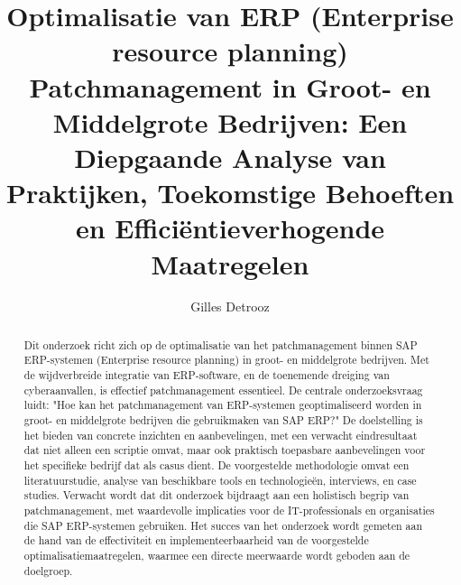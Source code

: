 \documentclass{hogent-article}
\title{Optimalisatie van ERP (Enterprise resource planning) Patchmanagement in Groot- en Middelgrote Bedrijven: Een Diepgaande Analyse van Praktijken, Toekomstige Behoeften en Efficiëntieverhogende Maatregelen}
\author{Gilles Detrooz}
\begin{document}
\begin{abstract}
    Dit onderzoek richt zich op de optimalisatie van het patchmanagement binnen SAP ERP-systemen (Enterprise resource planning) in groot- en middelgrote bedrijven. Met de wijdverbreide integratie van ERP-software, en de toenemende dreiging van cyberaanvallen, is effectief patchmanagement essentieel. De centrale onderzoeksvraag luidt: "Hoe kan het patchmanagement van ERP-systemen geoptimaliseerd worden in groot- en middelgrote bedrijven die gebruikmaken van SAP ERP?" De doelstelling is het bieden van concrete inzichten en aanbevelingen, met een verwacht eindresultaat dat niet alleen een scriptie omvat, maar ook praktisch toepasbare aanbevelingen voor het specifieke bedrijf dat als casus dient. De voorgestelde methodologie omvat een literatuurstudie, analyse van beschikbare tools en technologieën, interviews, en case studies. Verwacht wordt dat dit onderzoek bijdraagt aan een holistisch begrip van patchmanagement, met waardevolle implicaties voor de IT-professionals en organisaties die SAP ERP-systemen gebruiken. Het succes van het onderzoek wordt gemeten aan de hand van de effectiviteit en implementeerbaarheid van de voorgestelde optimalisatiemaatregelen, waarmee een directe meerwaarde wordt geboden aan de doelgroep.
\tableofcontents
\end{abstract}



\printbibliography[heading=bibintoc]
\end{document}

